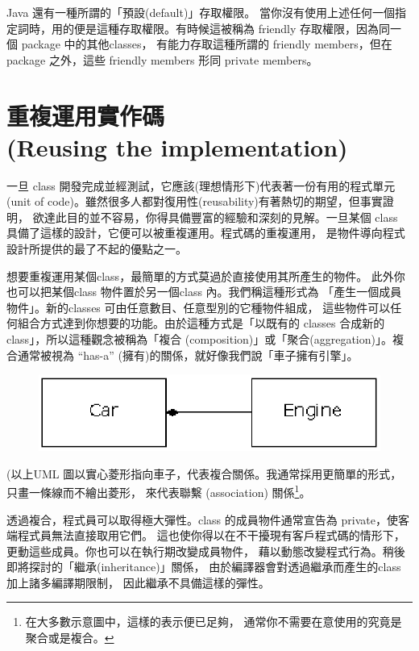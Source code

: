 Java 還有一種所謂的「預設(default)」存取權限。
當你沒有使用上述任何一個指定詞時，用的便是這種存取權限。有時候這被稱為
friendly 存取權限，因為同一個 package 中的其他classes，
有能力存取這種所謂的 friendly members，但在 package 之外，這些 friendly members
形同 private members。

\section{重複運用實作碼 \\(Reusing the implementation)}
一旦 class 開發完成並經測試，它應該(理想情形下)代表著一份有用的程式單元
(unit of code)。雖然很多人都對復用性(reusability)有著熱切的期望，但事實證明，
欲達此目的並不容易，你得具備豐富的經驗和深刻的見解。一旦某個 class
具備了這樣的設計，它便可以被重複運用。程式碼的重複運用，
是物件導向程式設計所提供的最了不起的優點之一。

想要重複運用某個class，最簡單的方式莫過於直接使用其所產生的物件。
此外你也可以把某個class 物件置於另一個class 內。我們稱這種形式為
「產生一個成員物件」。新的classes 可由任意數目、任意型別的它種物件組成，
這些物件可以任何組合方式達到你想要的功能。由於這種方式是「以既有的
classes 合成新的class」，所以這種觀念被稱為「複合
(composition)」或「聚合(aggregation)」。複合通常被視為 ``has-a''
(擁有)的關係，就好像我們說「車子擁有引擎」。

\begin{figure}[htbp]
\centering
\includegraphics{eps/TIJ204.eps}
\end{figure}

(以上UML 圖以實心菱形指向車子，代表複合關係。我通常採用更簡單的形式，
只畫一條線而不繪出菱形， 來代表聯繫 (association)
關係\footnote{在大多數示意圖中，這樣的表示便已足夠，
通常你不需要在意使用的究竟是聚合或是複合。}。

透過複合，程式員可以取得極大彈性。class 的成員物件通常宣告為
private，使客端程式員無法直接取用它們。
這也使你得以在不干擾現有客戶程式碼的情形下，
更動這些成員。你也可以在執行期改變成員物件，
藉以動態改變程式行為。稍後即將探討的「繼承(inheritance)」關係，
由於編譯器會對透過繼承而產生的class 加上諸多編譯期限制，
因此繼承不具備這樣的彈性。


